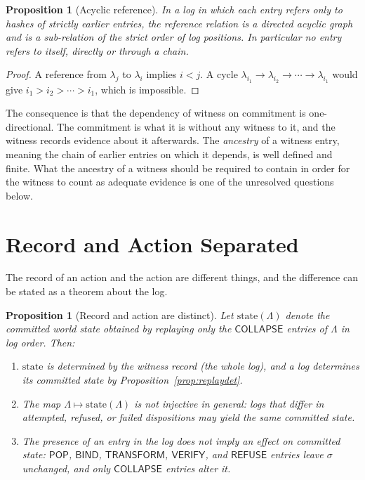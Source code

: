 \documentclass[11pt,twoside,openright]{book}
\theoremstyle{plain}
\newtheorem{proposition}[theorem]{Proposition}
\theoremstyle{definition}
\theoremstyle{remark}
\newcommand{\pop}{\mathsf{POP}}
\newcommand{\refuse}{\mathsf{REFUSE}}
\newcommand{\bind}{\mathsf{BIND}}
\newcommand{\transform}{\mathsf{TRANSFORM}}
\newcommand{\verify}{\mathsf{VERIFY}}
\newcommand{\collapse}{\mathsf{COLLAPSE}}
\begin{document}
\begin{proposition}[Acyclic reference]\label{prop:acyclic}
In a log in which each entry refers only to hashes of strictly earlier entries, the reference relation is a directed acyclic graph and is a sub-relation of the strict order of log positions. In particular no entry refers to itself, directly or through a chain.
\end{proposition}

\begin{proof}
A reference from $\lambda_j$ to $\lambda_i$ implies $i<j$. A cycle $\lambda_{i_1}\to\lambda_{i_2}\to\cdots\to\lambda_{i_1}$ would give $i_1>i_2>\cdots>i_1$, which is impossible.
\end{proof}

The consequence is that the dependency of witness on commitment is one-directional. The commitment is what it is without any witness to it, and the witness records evidence about it afterwards. The \emph{ancestry} of a witness entry, meaning the chain of earlier entries on which it depends, is well defined and finite. What the ancestry of a witness should be required to contain in order for the witness to count as adequate evidence is one of the unresolved questions below.

\section{Record and Action Separated}

The record of an action and the action are different things, and the difference can be stated as a theorem about the log.

\begin{proposition}[Record and action are distinct]\label{prop:recordaction}
Let $\mathrm{state}(\Lambda)$ denote the committed world state obtained by replaying only the $\collapse$ entries of $\Lambda$ in log order. Then:
\begin{enumerate}
\item[(a)] $\mathrm{state}$ is determined by the witness record (the whole log), and a log determines its committed state by Proposition~\ref{prop:replaydet}.
\item[(b)] The map $\Lambda\mapsto\mathrm{state}(\Lambda)$ is not injective in general: logs that differ in attempted, refused, or failed dispositions may yield the same committed state.
\item[(c)] The presence of an entry in the log does not imply an effect on committed state: $\pop$, $\bind$, $\transform$, $\verify$, and $\refuse$ entries leave $\sigma$ unchanged, and only $\collapse$ entries alter it.
\end{enumerate}
\end{proposition}
\end{document}
